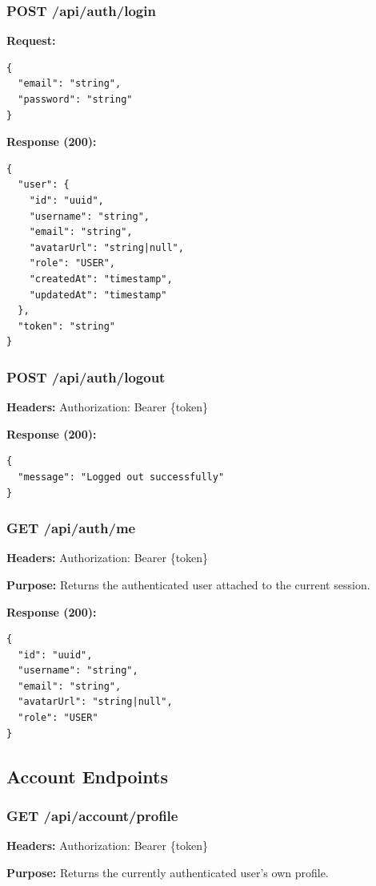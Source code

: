 \documentclass[11pt,a4paper]{article}
\begin{document}
\subsubsection{POST /api/auth/login}
\textbf{Request:}
\begin{lstlisting}
{
  "email": "string",
  "password": "string"
}
\end{lstlisting}

\textbf{Response (200):}
\begin{lstlisting}
{
  "user": {
    "id": "uuid",
    "username": "string",
    "email": "string",
    "avatarUrl": "string|null",
    "role": "USER",
    "createdAt": "timestamp",
    "updatedAt": "timestamp"
  },
  "token": "string"
}
\end{lstlisting}

\subsubsection{POST /api/auth/logout}
\textbf{Headers:} Authorization: Bearer \{token\}

\textbf{Response (200):}
\begin{lstlisting}
{
  "message": "Logged out successfully"
}
\end{lstlisting}

\subsubsection{GET /api/auth/me}
\textbf{Headers:} Authorization: Bearer \{token\}

\textbf{Purpose:} Returns the authenticated user attached to the current session.

\textbf{Response (200):}
\begin{lstlisting}
{
  "id": "uuid",
  "username": "string",
  "email": "string",
  "avatarUrl": "string|null",
  "role": "USER"
}
\end{lstlisting}

\subsection{Account Endpoints}

\subsubsection{GET /api/account/profile}
\textbf{Headers:} Authorization: Bearer \{token\}

\textbf{Purpose:} Returns the currently authenticated user's own profile.
\end{document}
